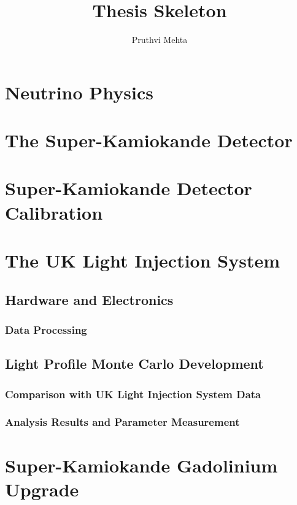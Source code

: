 \documentclass{article}
\title{Thesis Skeleton}
\author{Pruthvi Mehta }
\begin{document}
\maketitle

\section{Neutrino Physics}

\section{The Super-Kamiokande Detector}

\section{Super-Kamiokande Detector Calibration}

\section{The UK Light Injection System}

\subsection{Hardware and Electronics}

\subsubsection{Data Processing}

\subsection{Light Profile Monte Carlo Development}

\subsubsection{Comparison with UK Light Injection System Data}

\subsubsection{Analysis Results and Parameter Measurement}

\section{Super-Kamiokande Gadolinium Upgrade}
\end{document}
